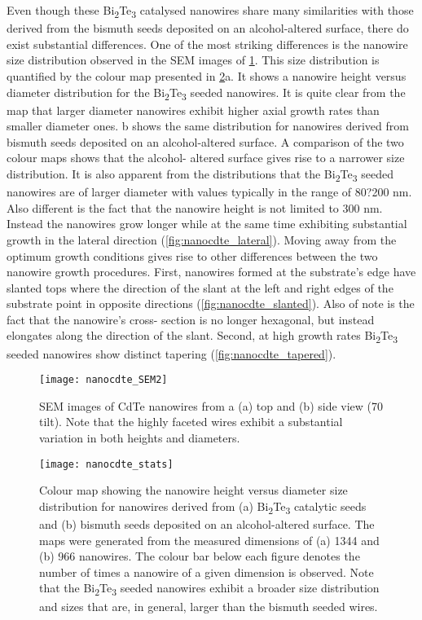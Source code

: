 Even though these Bi\textsubscript{2}Te\textsubscript{3} catalysed nanowires share many similarities with those derived from the bismuth seeds deposited on an alcohol-altered surface, there do exist substantial differences.
One of the most striking differences is the nanowire size distribution observed in the SEM images of \cref{fig:nanocdte_SEM2}.
This size distribution is quantified by the colour map presented in \cref{fig:nanocdte_stats}a.
It shows a nanowire height versus diameter distribution for the Bi\textsubscript{2}Te\textsubscript{3} seeded nanowires.
It is quite clear from the map that larger diameter nanowires exhibit higher axial growth rates than smaller diameter ones.
b shows the same distribution for nanowires derived from bismuth seeds deposited on an alcohol-altered surface.
A comparison of the two colour maps shows that the alcohol- altered surface gives rise to a narrower size distribution.
It is also apparent from the distributions that the Bi\textsubscript{2}Te\textsubscript{3} seeded nanowires are of larger diameter with values typically in the range of 80?200 nm.
Also different is the fact that the nanowire height is not limited to 300 nm.
Instead the nanowires grow longer while at the same time exhibiting substantial growth in the lateral direction (\cref{fig:nanocdte_lateral}).
Moving away from the optimum growth conditions gives rise to other differences between the two nanowire growth procedures.
First, nanowires formed at the substrate's edge have slanted tops where the direction of the slant at the left and right edges of the substrate point in opposite directions (\cref{fig:nanocdte_slanted}).
Also of note is the fact that the nanowire's cross- section is no longer hexagonal, but instead elongates along the direction of the slant.
Second, at high growth rates Bi\textsubscript{2}Te\textsubscript{3} seeded nanowires show distinct tapering (\cref{fig:nanocdte_tapered}).
\begin{figure}
 \centering \texttt{[image: nanocdte\_SEM2]}
 \caption[SEM image of CdTe nanowires]{\label{fig:nanocdte_SEM2}SEM images of CdTe nanowires from a (a) top and (b) side view (70\degree{} tilt).
  Note that the highly faceted wires exhibit a substantial variation in both heights and diameters.}
\end{figure}
\begin{figure}
 \centering \texttt{[image: nanocdte\_stats]}
 \caption[CdTe nanowire dimension colourmap]{\label{fig:nanocdte_stats}Colour map showing the nanowire height versus diameter size distribution for nanowires derived from (a) Bi\textsubscript{2}Te\textsubscript{3} catalytic seeds and (b) bismuth seeds deposited on an alcohol-altered surface.
  The maps were generated from the measured dimensions of (a) 1344 and (b) 966 nanowires.
  The colour bar below each figure denotes the number of times a nanowire of a given dimension is observed.
  Note that the Bi\textsubscript{2}Te\textsubscript{3} seeded nanowires exhibit a broader size distribution and sizes that are, in general, larger than the bismuth seeded wires.}
\end{figure}
